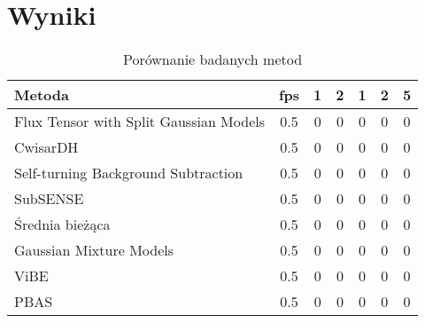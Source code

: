 \section{Wyniki}
\begin{table}[t]
\caption{Porównanie badanych metod}
\label{tab:results}
\centering
\begin{tabular}{|l*{6}{|c}|}
  \hline 
  \textbf{Metoda} & \textbf{fps} & \textbf{1} & \textbf{2} & \textbf{1} & \textbf{2} & \textbf{5}\\
  \hline
  Flux Tensor with Split Gaussian Models & 0.5 & 0 & 0 & 0 & 0 & 0\\
  \hline
  CwisarDH & 0.5 & 0 & 0 & 0 & 0 & 0\\
  \hline
  Self-turning Background Subtraction & 0.5 & 0 & 0 & 0 & 0 & 0\\
  \hline
  SubSENSE & 0.5 & 0 & 0 & 0 & 0 & 0\\
  \hline
  Średnia bieżąca & 0.5 & 0 & 0 & 0 & 0 & 0\\
  \hline
  Gaussian Mixture Models & 0.5 & 0 & 0 & 0 & 0 & 0\\
  \hline
  ViBE & 0.5 & 0 & 0 & 0 & 0 & 0\\
  \hline
  PBAS & 0.5 & 0 & 0 & 0 & 0 & 0\\
  \hline
\end{tabular}
\end{table}